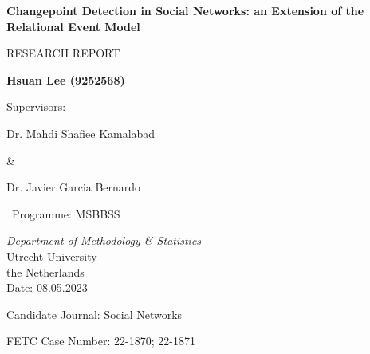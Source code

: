 \documentclass[]{interact}
\theoremstyle{plain}%
\theoremstyle{definition}
\theoremstyle{remark}
\begin{document}
	
	\begin{titlepage}
		\begin{center}
			\vspace*{1.1cm}
			
			\Huge
			\textbf{Changepoint Detection in Social Networks: an Extension of the Relational Event Model}
			
			\vspace{1.8cm}
			\LARGE
			RESEARCH REPORT
			
			\vspace{1.8cm}
			
			\textbf{Hsuan Lee (9252568)}
			
			\vspace{1cm}
			Supervisors: 
			
			\vspace{0.5cm}
			
			Dr. Mahdi Shafiee Kamalabad 
			
			\& 
			
			Dr. Javier Garcia Bernardo
			
			\vspace{2cm}
			\Large
			
			\ Programme: MSBBSS
			
			\vspace{0.3cm}
			
			\emph{Department of Methodology \& Statistics}\\
			
			\vspace{0.3cm}
			Utrecht University\\
			the Netherlands\\
			
			\vspace{1.5cm}    
			\Large
			Date: 08.05.2023
			
			Candidate Journal: Social Networks
			
			FETC Case Number: 22-1870; 22-1871
		
		\end{center}
	\end{titlepage}
	
	
	\vspace*{1cm}
	 \\
	
\end{document}
